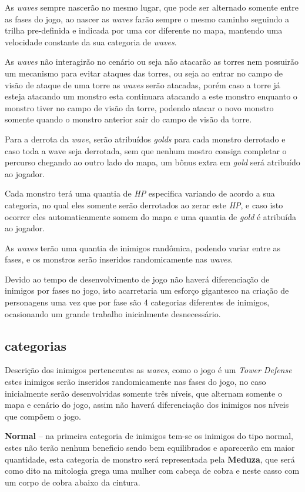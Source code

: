 \documentclass[11pt]{article} %
\begin{document}
As \textit{waves} sempre nascerão no mesmo lugar, que pode ser alternado somente entre as fases do jogo, ao nascer as \textit{waves} farão sempre o mesmo caminho seguindo a trilha pre-definida e indicada por uma cor diferente no mapa, mantendo uma velocidade constante da sua categoria de \textit{waves}. 

As \textit{waves} não interagirão no cenário ou seja não atacarão as torres nem possuirão um mecanismo para evitar ataques das torres, ou seja ao entrar no campo de visão de ataque de uma torre as \textit{waves} serão atacadas, porém caso a torre já esteja atacando um monstro esta continuara atacando a este monstro enquanto o monstro tiver no campo de visão da torre, podendo atacar o novo monstro somente quando o monstro anterior sair do campo de visão da torre.  

Para a derrota da \textit{wave}, serão atribuídos \textit{golds} para cada monstro derrotado e caso toda a wave seja derrotada, sem que nenhum mostro consiga completar o percurso chegando ao outro lado do mapa, um bônus extra em \textit{gold} será atribuído ao jogador. 

Cada monstro terá uma quantia de \textit{HP} especifica variando de acordo a sua categoria, no qual eles somente serão derrotados ao zerar este \textit{HP}, e caso isto ocorrer eles automaticamente somem do mapa e uma quantia de \textit{gold} é atribuída ao jogador.

As \textit{waves} terão uma quantia de inimigos randômica, podendo variar entre as fases, e os monstros serão inseridos randomicamente nas \textit{waves}.

Devido ao tempo de desenvolvimento de jogo não haverá diferenciação de inimigos por fases no jogo, isto acarretaria um esforço gigantesco na criação de personagens uma vez que por fase são 4 categorias diferentes de inimigos, ocasionando um grande trabalho inicialmente desnecessário. 

\subsection{categorias}
Descrição dos inimigos pertencentes as \textit{waves}, como o jogo é um \textit{Tower Defense} estes inimigos serão inseridos randomicamente nas fases do jogo, no caso inicialmente serão desenvolvidas somente três níveis, que alternam somente o mapa e cenário do jogo, assim não haverá diferenciação dos inimigos nos níveis que compõem o jogo.

\textbf{{ {\large Normal}}} – na primeira categoria de inimigos tem-se os inimigos do tipo normal, estes não terão nenhum beneficio sendo bem equilibrados e aparecerão em maior quantidade, esta categoria de monstro será representada pela \textbf{Meduza}, que será como dito na mitologia grega uma mulher com cabeça de cobra e neste casso com um corpo de cobra abaixo da cintura.
\end{document}
